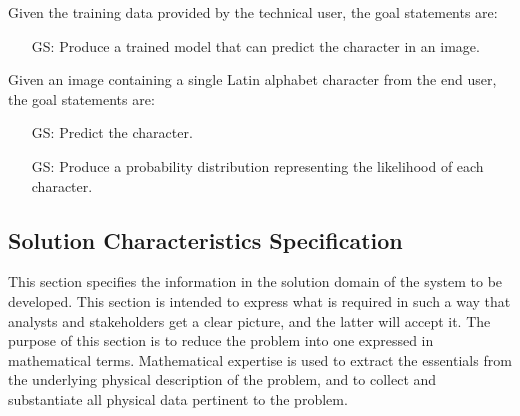 \documentclass[12pt]{article}
\newcounter{goalnum} %
\begin{document}
\noindent Given the training data provided by the technical user, the goal
statements are:

\begin{itemize}

\item[GS\refstepcounter{goalnum}\thegoalnum \label{G_train}:] Produce a trained
model that can predict the character in an image.

\end{itemize}

\noindent Given an image containing a single Latin alphabet character from the
end user, the goal statements are:

\begin{itemize}

\item[GS\refstepcounter{goalnum}\thegoalnum \label{G_predict}:] Predict the character.
\item[GS\refstepcounter{goalnum}\thegoalnum \label{G_probability}:] Produce a probability distribution
representing the likelihood of each character.

\end{itemize}

\subsection{Solution Characteristics Specification}

This section specifies the information in the solution domain of the system
to be developed. This section is intended to express what is required in
such a way that analysts and stakeholders get a clear picture, and the
latter will accept it. The purpose of this section is to reduce the problem
into one expressed in mathematical terms. Mathematical expertise is used to
extract the essentials from the underlying physical description of the
problem, and to collect and substantiate all physical data pertinent to the
problem.

\end{document}
